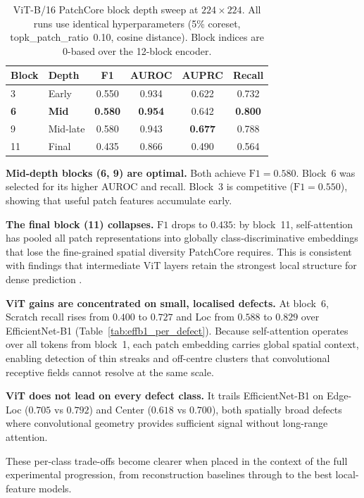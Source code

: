\documentclass[11pt]{article}
\begin{document}
\begin{table}[H]
\centering
\caption{ViT-B/16 PatchCore block depth sweep at $224\!\times\!224$. All runs use
identical hyperparameters (5\% coreset, topk\_patch\_ratio~0.10, cosine distance).
Block indices are 0-based over the 12-block encoder.}
\label{tab:vit_block_sweep}
\begin{tabular}{llcccc}
\toprule
Block & Depth & F1 & AUROC & AUPRC & Recall \\
\midrule
3  & Early     & 0.550 & 0.934 & 0.622 & 0.732 \\
\textbf{6}  & \textbf{Mid}  & \textbf{0.580} & \textbf{0.954} & 0.642 & \textbf{0.800} \\
9  & Mid-late  & 0.580 & 0.943 & \textbf{0.677} & 0.788 \\
11 & Final     & 0.435 & 0.866 & 0.490 & 0.564 \\
\bottomrule
\end{tabular}
\end{table}

\textbf{Mid-depth blocks (6, 9) are optimal.} Both achieve $\mathrm{F1}=0.580$. Block~6 was selected for its higher AUROC and recall. Block~3 is competitive ($\mathrm{F1}=0.550$), showing that useful patch features accumulate early.

\textbf{The final block (11) collapses.} $\mathrm{F1}$ drops to $0.435$: by block~11, self-attention has pooled all patch representations into globally class-discriminative embeddings that lose the fine-grained spatial diversity PatchCore requires. This is consistent with findings that intermediate ViT layers retain the strongest local structure for dense prediction \cite{caron2021dino}.

\textbf{ViT gains are concentrated on small, localised defects.} At block~6, Scratch recall rises from $0.400$ to $0.727$ and Loc from $0.588$ to $0.829$ over EfficientNet-B1 (Table~\ref{tab:effb1_per_defect}). Because self-attention operates over all tokens from block~1, each patch embedding carries global spatial context, enabling detection of thin streaks and off-centre clusters that convolutional receptive fields cannot resolve at the same scale.

\textbf{ViT does not lead on every defect class.} It trails EfficientNet-B1 on Edge-Loc ($0.705$ vs $0.792$) and Center ($0.618$ vs $0.700$), both spatially broad defects where convolutional geometry provides sufficient signal without long-range attention.

These per-class trade-offs become clearer when placed in the context of the full experimental progression, from reconstruction baselines through to the best local-feature models.
\end{document}
